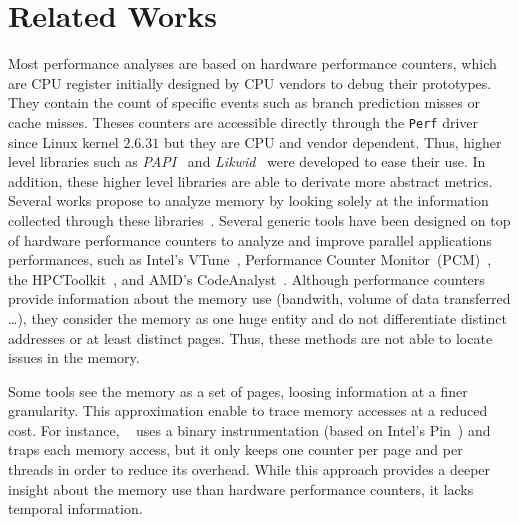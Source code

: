 
\section{Related Works}
\label{sec:related}

Most performance analyses are based on hardware performance counters, which are CPU
register initially designed by CPU vendors to debug their prototypes. They contain
the count of specific events such as branch prediction misses or cache misses.
Theses counters are accessible directly  through the \texttt{Perf} driver
since Linux kernel $2.6.31$ but they are CPU and vendor dependent. Thus, higher
level libraries such as \emph{PAPI}~\cite{Weaver13PAPI} and
\emph{Likwid}~\cite{Treibig10LIKWID} were developed to ease their use.
In addition, these higher level libraries are able to derivate more abstract metrics. Several works propose to analyze memory 
by looking solely at the information collected through these
libraries~\cite{Majo13(Mis)understanding,
Jiang14Understanding,Bosch00Rivet,Weyers14Visualization,Tao01Visualizing,DeRose01Hardware}.
%
Several generic tools have been designed on top of hardware performance counters
to analyze and improve parallel applications performances, such as Intel's
VTune~\cite{Reinders05VTune}, Performance Counter
Monitor~(PCM)~\cite{Intel2012b}, the HPCToolkit~\cite{Adhianto10HPCTOOLKIT},
and AMD's CodeAnalyst~\cite{Drongowski2008}.
%
Although performance counters provide information about the memory use
(bandwith, volume of data transferred \ldots),  they consider the memory as
one huge entity and do not differentiate distinct addresses or at least
distinct pages. Thus, these methods are not able to locate issues in the memory.

Some tools see the memory as a set of pages, loosing information at a finer
granularity. This approximation enable to trace memory accesses at a reduced
cost. For instance, \TABARNAC~\cite{Beniamine15TABARNAC} uses a binary
instrumentation (based on Intel's Pin~\cite{Luk05Pin}) and traps each
memory access, but it only keeps one counter per page and per threads in order to
reduce its overhead. While this approach provides a deeper insight about the
memory use than hardware performance counters, it lacks temporal information.

